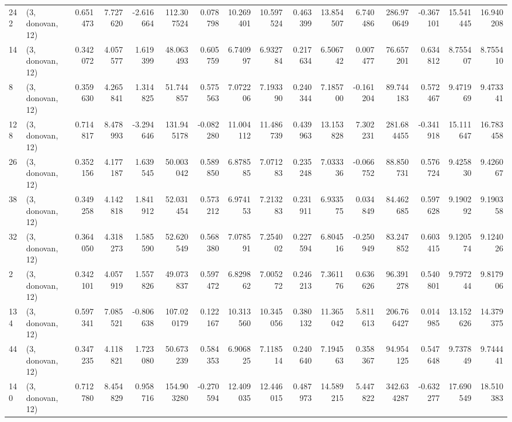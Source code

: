 \begin{tabular}{llrrrrrrrrrrrrrr}
242 &  (3, donovan, 12) &   0.651473 &   7.727620 &  -2.616664 &   112.307524 &   0.078798 &  10.269401 &  10.597524 &  0.463399 &  13.854507 &   6.740486 &   286.970649 &  -0.367101 &  15.541445 &  16.940208 \\
14  &  (3, donovan, 12) &   0.342072 &   4.057577 &   1.619399 &    48.063493 &   0.605759 &   6.740997 &   6.932784 &  0.217634 &   6.506742 &   0.007477 &    76.657201 &   0.634812 &   8.755407 &   8.755410 \\
8   &  (3, donovan, 12) &   0.359630 &   4.265841 &   1.314825 &    51.744857 &   0.575563 &   7.072206 &   7.193390 &  0.240344 &   7.185700 &  -0.161204 &    89.744183 &   0.572467 &   9.471969 &   9.473341 \\
128 &  (3, donovan, 12) &   0.714817 &   8.478993 &  -3.294646 &   131.945178 &  -0.082280 &  11.004112 &  11.486739 &  0.439963 &  13.153828 &   7.302231 &   281.684455 &  -0.341918 &  15.111647 &  16.783458 \\
26  &  (3, donovan, 12) &   0.352156 &   4.177187 &   1.639545 &    50.003042 &   0.589850 &   6.878585 &   7.071283 &  0.235248 &   7.033336 &  -0.066752 &    88.850731 &   0.576724 &   9.425830 &   9.426067 \\
38  &  (3, donovan, 12) &   0.349258 &   4.142818 &   1.841912 &    52.031454 &   0.573212 &   6.974153 &   7.213283 &  0.231911 &   6.933575 &   0.034849 &    84.462685 &   0.597628 &   9.190292 &   9.190358 \\
32  &  (3, donovan, 12) &   0.364050 &   4.318273 &   1.585590 &    52.620549 &   0.568380 &   7.078591 &   7.254002 &  0.227594 &   6.804516 &  -0.250949 &    83.247852 &   0.603415 &   9.120574 &   9.124026 \\
2   &  (3, donovan, 12) &   0.342101 &   4.057919 &   1.557826 &    49.073837 &   0.597472 &   6.829862 &   7.005272 &  0.246213 &   7.361176 &   0.636626 &    96.391278 &   0.540801 &   9.797244 &   9.817906 \\
134 &  (3, donovan, 12) &   0.597341 &   7.085521 &  -0.806638 &   107.020179 &   0.122167 &  10.313560 &  10.345056 &  0.380132 &  11.365042 &   5.811613 &   206.766427 &   0.014985 &  13.152626 &  14.379375 \\
44  &  (3, donovan, 12) &   0.347235 &   4.118821 &   1.723080 &    50.673239 &   0.584353 &   6.906825 &   7.118514 &  0.240640 &   7.194563 &   0.358367 &    94.954125 &   0.547648 &   9.737849 &   9.744441 \\
140 &  (3, donovan, 12) &   0.712780 &   8.454829 &   0.958716 &   154.903280 &  -0.270594 &  12.409035 &  12.446015 &  0.487973 &  14.589215 &   5.447822 &   342.634287 &  -0.632277 &  17.690549 &  18.510383 \\

\end{tabular}
